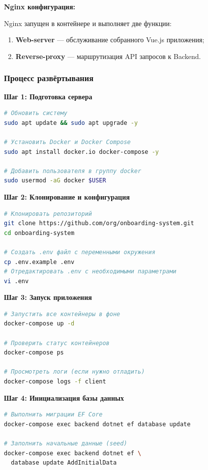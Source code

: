 \textbf{Nginx конфигурация:}

Nginx запущен в контейнере и выполняет две функции:
\begin{enumerate}
    \item \textbf{Web-server} --- обслуживание собранного Vue.js приложения;
    \item \textbf{Reverse-proxy} --- маршрутизация API запросов к Backend.
\end{enumerate}

\subsubsection{Процесс развёртывания}

\textbf{Шаг 1: Подготовка сервера}
\begin{lstlisting}[language=bash, basicstyle=\ttfamily\small]
# Обновить систему
sudo apt update && sudo apt upgrade -y

# Установить Docker и Docker Compose
sudo apt install docker.io docker-compose -y

# Добавить пользователя в группу docker
sudo usermod -aG docker $USER
\end{lstlisting}

\textbf{Шаг 2: Клонирование и конфигурация}
\begin{lstlisting}[language=bash, basicstyle=\ttfamily\small]
# Клонировать репозиторий
git clone https://github.com/org/onboarding-system.git
cd onboarding-system

# Создать .env файл с переменными окружения
cp .env.example .env
# Отредактировать .env с необходимыми параметрами
vi .env
\end{lstlisting}

\textbf{Шаг 3: Запуск приложения}
\begin{lstlisting}[language=bash, basicstyle=\ttfamily\small]
# Запустить все контейнеры в фоне
docker-compose up -d

# Проверить статус контейнеров
docker-compose ps

# Просмотреть логи (если нужно отладить)
docker-compose logs -f client
\end{lstlisting}

\textbf{Шаг 4: Инициализация базы данных}
\begin{lstlisting}[language=bash, basicstyle=\ttfamily\small]
# Выполнить миграции EF Core
docker-compose exec backend dotnet ef database update

# Заполнить начальные данные (seed)
docker-compose exec backend dotnet ef \
  database update AddInitialData
\end{lstlisting}

